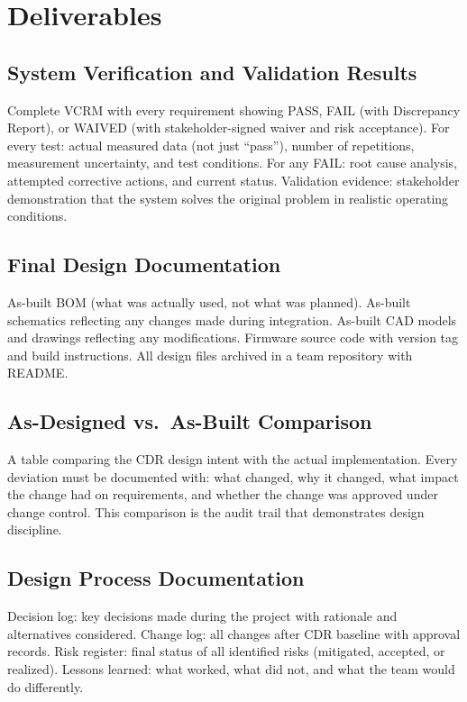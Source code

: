 \documentclass[11pt,letterpaper,twoside,openany]{book}
\begin{document}
\section{Deliverables}

\subsection{System Verification and Validation Results}
Complete VCRM with every requirement showing PASS, FAIL (with Discrepancy Report), or WAIVED (with stakeholder-signed waiver and risk acceptance). For every test: actual measured data (not just ``pass''), number of repetitions, measurement uncertainty, and test conditions. For any FAIL: root cause analysis, attempted corrective actions, and current status. Validation evidence: stakeholder demonstration that the system solves the original problem in realistic operating conditions.

\subsection{Final Design Documentation}
As-built BOM (what was actually used, not what was planned). As-built schematics reflecting any changes made during integration. As-built CAD models and drawings reflecting any modifications. Firmware source code with version tag and build instructions. All design files archived in a team repository with README.

\subsection{As-Designed vs.\ As-Built Comparison}
A table comparing the CDR design intent with the actual implementation. Every deviation must be documented with: what changed, why it changed, what impact the change had on requirements, and whether the change was approved under change control. This comparison is the audit trail that demonstrates design discipline.

\subsection{Design Process Documentation}
Decision log: key decisions made during the project with rationale and alternatives considered. Change log: all changes after CDR baseline with approval records. Risk register: final status of all identified risks (mitigated, accepted, or realized). Lessons learned: what worked, what did not, and what the team would do differently.
\end{document}
